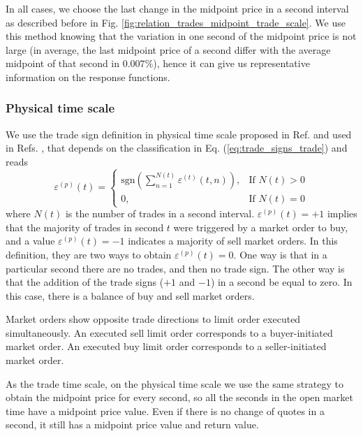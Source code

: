 In all cases, we choose the last change in the midpoint price in a second
interval as described before in Fig.
\ref{fig:relation_trades_midpoint_trade_scale}. We use this method knowing that
the variation in one second of the midpoint price is not large (in average, the
last midpoint price of a second differ with the average midpoint of that second
in $0.007\%$), hence it can give us representative information on the response
functions.

\subsubsection*{Physical time scale}\label{subsubsec:physical_time}

We use the trade sign definition in physical time scale proposed in Ref.
\cite{Wang_2016_cross} and used in Refs.
\cite{Wang_2017,Wang_2016_avg}, that depends on the classification in
Eq. (\ref{eq:trade_signs_trade}) and reads
\begin{equation}\label{eq:trade_signs_physical}
    \varepsilon^{\left(p\right)}\left(t\right)=\left\{
    \begin{array}{cc}
    \text{sgn}\left(\sum_{n=1}^{N\left(t\right)}\varepsilon^{\left(t\right)}
    \left(t,n\right)\right),
    & \text{If }N \left(t\right)>0\\
    0, & \text{If }N\left(t\right)=0
    \end{array}\right.
\end{equation}
where $N \left(t \right)$ is the number of trades in a second interval.
$\varepsilon^{\left(p\right)}\left( t \right) = +1$ implies that the majority
of trades in second $t$ were triggered by a market order to buy, and a value
$\varepsilon^{\left(p\right)}\left( t \right) = -1$ indicates a majority of
sell market orders. In this definition, they are two ways to obtain
$\varepsilon^{\left(p\right)}\left( t \right) = 0$. One way is that in a
particular second there are no trades, and then no trade sign. The other way is
that the addition of the trade signs ($+1$ and $-1$) in a second be equal to
zero. In this case, there is a balance of buy and sell market orders.

Market orders show opposite trade directions to limit order executed
simultaneously. An executed sell limit order corresponds to a buyer-initiated
market order. An executed buy limit order corresponds to a seller-initiated
market order.

As the trade time scale, on the physical time scale we use the same strategy
to obtain the midpoint price for every second, so all the seconds in the open
market time have a midpoint price value. Even if there is no change of quotes
in a second, it still has a midpoint price value and return value.


